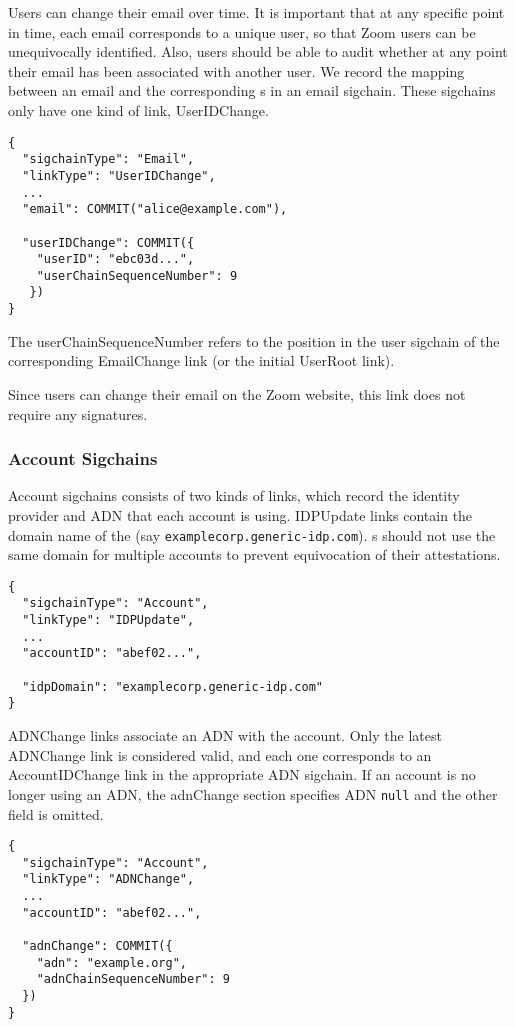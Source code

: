 Users can change their email over time. It is important that at any specific point in time, each
email corresponds to a unique user, so that Zoom users can be unequivocally identified. Also, users
should be able to audit whether at any point their email has been associated with another user. We
record the mapping between an email and the corresponding {\userID}s in an email sigchain. These
sigchains only have one kind of link, \textsf{UserIDChange}.

\begin{Verbatim}
{
  "sigchainType": "Email",
  "linkType": "UserIDChange",
  ...
  "email": COMMIT("alice@example.com"),

  "userIDChange": COMMIT({
    "userID": "ebc03d...",
    "userChainSequenceNumber": 9
   })
}
\end{Verbatim}

The \textsf{userChainSequenceNumber} refers to the position in the user sigchain of the
corresponding \textsf{EmailChange} link (or the initial \textsf{UserRoot} link).

Since users can change their email on the Zoom website, this link does not require any signatures.

\subsubsection{Account Sigchains}

Account sigchains consists of two kinds of links, which record the identity provider and ADN that
each account is using. \textsf{IDPUpdate} links contain the domain name of the \idp (say
\texttt{examplecorp.generic-idp.com}). {\idp}s should not use the same domain for multiple accounts
to prevent equivocation of their attestations.

\begin{Verbatim}
{
  "sigchainType": "Account",
  "linkType": "IDPUpdate",
  ...
  "accountID": "abef02...",

  "idpDomain": "examplecorp.generic-idp.com"
}
\end{Verbatim}

\textsf{ADNChange} links associate an ADN with the account. Only the latest \textsf{ADNChange} link
is considered valid, and each one corresponds to an \textsf{AccountIDChange} link in the appropriate
ADN sigchain. If an account is no longer using an ADN, the \textsf{adnChange} section specifies ADN
\texttt{null} and the other field is omitted.

\begin{Verbatim}
{
  "sigchainType": "Account",
  "linkType": "ADNChange",
  ...
  "accountID": "abef02...",

  "adnChange": COMMIT({
    "adn": "example.org",
    "adnChainSequenceNumber": 9
  })
}
\end{Verbatim}


